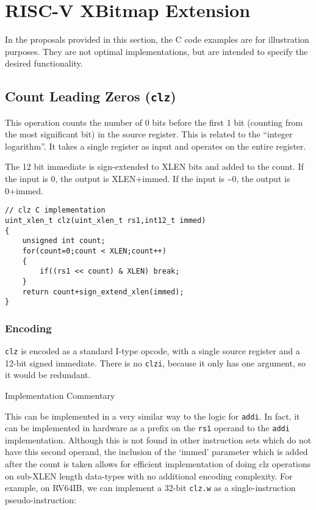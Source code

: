 \chapter{RISC-V XBitmap Extension}\label{risc-v-b-hardware-instructions}

In the proposals provided in this section, the C code examples are for
illustration purposes. They are not optimal implementations, but are
intended to specify the desired functionality.


\section{Count Leading Zeros (\texttt{clz})}

This operation counts the number of 0 bits before the first 1 bit
(counting from the most significant bit) in the source register. This is
related to the ``integer logarithm''. It takes a single register as
input and operates on the entire register.

The 12 bit immediate is sign-extended to XLEN bits and added to the
count. If the input is 0, the output is XLEN+immed. If the input is
\textasciitilde{}0, the output is 0+immed.

\begin{verbatim}
// clz C implementation
uint_xlen_t clz(uint_xlen_t rs1,int12_t immed)
{
    unsigned int count;
    for(count=0;count < XLEN;count++)
    {
        if((rs1 << count) & XLEN) break;
    }
    return count+sign_extend_xlen(immed);
}
\end{verbatim}

\subsection{Encoding}



\texttt{clz} is encoded as a standard I-type opcode, with a single
source register and a 12-bit signed immediate. There is no
\texttt{clzi}, because it only has one argument, so it would be
redundant.

Implementation Commentary

This can be implemented in a very similar way to the logic for
\texttt{addi}. In fact, it can be implemented in hardware as a prefix on
the \texttt{rs1} operand to the \texttt{addi} implementation. Although
this is not found in other instruction sets which do not have this
second operand, the inclusion of the `immed' parameter which is added
after the count is taken allows for efficient implementation of doing
clz operations on sub-XLEN length data-types with no additional encoding
complexity. For example, on RV64IB, we can implement a 32-bit
\texttt{clz.w} as a single-instruction pseudo-instruction:

